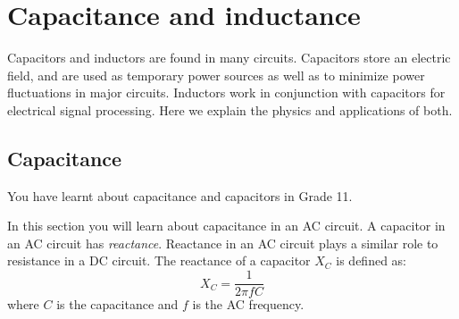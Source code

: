 \section{Capacitance and inductance}

Capacitors and inductors are found in many circuits. Capacitors store an electric field, and are used as temporary power sources as well as to minimize power fluctuations in major circuits. Inductors work in conjunction with capacitors for electrical signal processing. Here we explain the physics and applications of both.

\subsection{Capacitance}
You have learnt about capacitance and capacitors in Grade 11. %
 
In this section you will learn about capacitance in an AC circuit. A capacitor in an AC circuit has \textit{reactance}. Reactance in an AC circuit plays a similar role to resistance in a DC circuit. The reactance of a capacitor $X_C$ is defined as:\\
\begin{equation*}
X_C=\frac{1}{2\pi fC}
\end{equation*}
where $C$ is the capacitance and $f$ is the AC frequency.\\
 
